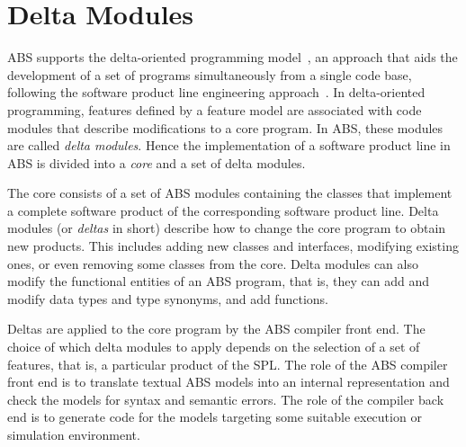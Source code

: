\chapter{Delta Modules}
\label{ch:deltas}

ABS supports the delta-oriented programming model~\cite{SchaeferBBDT10}, an
approach that aids the development of a set of programs simultaneously from a
single code base, following the software product line engineering
approach~\cite{PohlBL05}.
In delta-oriented programming, features defined by a feature model are
associated with code modules that describe modifications to a core program. In
ABS, these modules are called \emph{delta modules}. Hence the implementation of
a software product line in ABS is divided into a \emph{core} and a set of delta
modules.

The core consists of a set of ABS modules containing the classes that implement
a complete software product of the corresponding software product line. Delta
modules (or \emph{deltas} in short) describe how to change the core program to
obtain new products. This includes adding new classes and interfaces, modifying
existing ones, or even removing some classes from the core. Delta modules can
also modify the functional entities of an ABS program, that is, they can add and
modify data types and type synonyms, and add functions.

Deltas are applied to the core program by the ABS compiler front end. The choice
of which delta modules to apply depends on the selection of a set of features,
that is, a particular product of the SPL.
The role of the ABS compiler front end is to translate textual ABS models into
an internal representation and check the models for syntax and semantic errors.
The role of the compiler back end is to generate code for the models targeting
some suitable execution or simulation environment.


